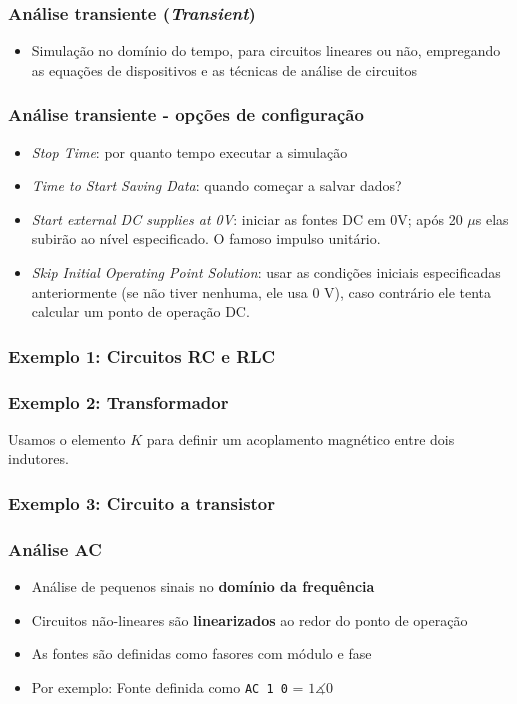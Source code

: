 \documentclass{beamer}
\begin{document}
\begin{frame}
\frametitle{Análise transiente (\textit{Transient})}
\begin{itemize}
\item{Simulação no domínio do tempo, para circuitos lineares ou não, empregando as equações de dispositivos e as técnicas de análise de circuitos}
\end{itemize}
\end{frame}

\begin{frame}
\frametitle{Análise transiente - opções de configuração}
\begin{itemize} 
\item \textit{Stop Time}: por quanto tempo executar a simulação
\item \textit{Time to Start Saving Data}: quando começar a salvar dados?
\item \textit{Start external DC supplies at 0V}: iniciar as fontes DC em 0V; após 20 $\mu$s elas subirão ao nível especificado. O famoso impulso unitário.
\item \textit{Skip Initial Operating Point Solution}: usar as condições iniciais especificadas anteriormente (se não tiver nenhuma, ele usa 0 V), caso contrário ele tenta calcular um ponto de operação DC.
\end{itemize}
\end{frame}

\begin{frame}
\frametitle{Exemplo 1: Circuitos RC e RLC}
\end{frame}

\begin{frame}
\frametitle{Exemplo 2: Transformador}
Usamos o elemento $K$ para definir um acoplamento magnético entre dois indutores.
\end{frame}

\begin{frame}
\frametitle{Exemplo 3: Circuito a transistor}
\end{frame}

\begin{frame}
\frametitle{Análise AC}
\begin{itemize}
\item{Análise de pequenos sinais no \textbf{domínio da frequência}}
\item{Circuitos não-lineares são \textbf{linearizados} ao redor do ponto de operação}
\item{As fontes são definidas como fasores com módulo e fase}
\item{Por exemplo: Fonte definida como \texttt{AC 1 0} = $1\measuredangle 0$} 
\end{itemize}
\end{frame}
\end{document}
